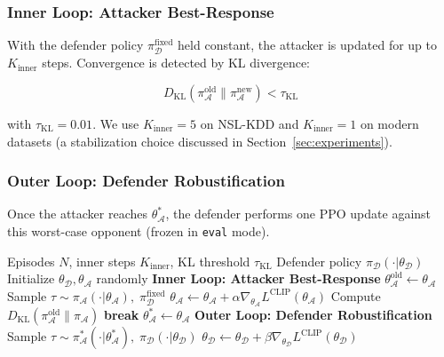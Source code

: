 \subsubsection{Inner Loop: Attacker Best-Response}
With the defender policy $\pi_\mathcal{D}^{\text{fixed}}$ held constant, the attacker is updated for up to $K_{\text{inner}}$ steps. Convergence is detected by KL divergence:

\begin{equation}
    D_{\text{KL}}(\pi_{\mathcal{A}}^{\text{old}} \| \pi_{\mathcal{A}}^{\text{new}}) < \tau_{\text{KL}}
    \label{eq:kl}
\end{equation}

with $\tau_{\text{KL}} = 0.01$. We use $K_{\text{inner}} = 5$ on NSL-KDD and $K_{\text{inner}} = 1$ on modern datasets (a stabilization choice discussed in Section~\ref{sec:experiments}).

\subsubsection{Outer Loop: Defender Robustification}
Once the attacker reaches $\theta_{\mathcal{A}}^*$, the defender performs one PPO update against this worst-case opponent (frozen in \texttt{eval} mode).

\begin{algorithm}[h]
    \caption{Bi-level Adversarial RL (Bi-ARL)}
    \label{alg:biarl}
    \begin{algorithmic}[1]
        \Require Episodes $N$, inner steps $K_{\text{inner}}$, KL threshold $\tau_{\text{KL}}$
        \Ensure Defender policy $\pi_\mathcal{D}(\cdot|\theta_\mathcal{D})$
        \State Initialize $\theta_\mathcal{D}, \theta_\mathcal{A}$ randomly
            \State \textbf{Inner Loop: Attacker Best-Response}
            \State $\theta_{\mathcal{A}}^{\text{old}} \leftarrow \theta_{\mathcal{A}}$
                \State Sample $\tau \sim \pi_{\mathcal{A}}(\cdot|\theta_{\mathcal{A}}),\; \pi_{\mathcal{D}}^{\text{fixed}}$
                \State $\theta_{\mathcal{A}} \leftarrow \theta_{\mathcal{A}} + \alpha \nabla_{\theta_{\mathcal{A}}} L^{\text{CLIP}}(\theta_{\mathcal{A}})$
                \State Compute $D_{\text{KL}}(\pi_{\mathcal{A}}^{\text{old}} \| \pi_{\mathcal{A}})$
                    \State \textbf{break} 
                \EndIf
            \EndFor
            \State $\theta_{\mathcal{A}}^* \leftarrow \theta_{\mathcal{A}}$ 
            \State \textbf{Outer Loop: Defender Robustification}
            \State Sample $\tau \sim \pi_{\mathcal{A}}^*(\cdot|\theta_{\mathcal{A}}^*),\; \pi_{\mathcal{D}}(\cdot|\theta_{\mathcal{D}})$
            \State $\theta_{\mathcal{D}} \leftarrow \theta_{\mathcal{D}} + \beta \nabla_{\theta_{\mathcal{D}}} L^{\text{CLIP}}(\theta_{\mathcal{D}})$
        \EndFor
    \end{algorithmic}
\end{algorithm}

